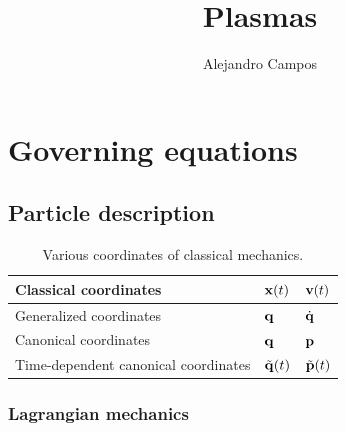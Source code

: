 \documentclass[a4paper,11pt]{report}
\title{Plasmas}
\author{Alejandro Campos}
\newcommand{\qvecdot}{\dot{\qvec}}
\begin{document}
\maketitle
\tableofcontents

\chapter{Governing equations}

\section{Particle description}
\begin{table}[H]
    \renewcommand{\arraystretch}{1.5}
    \centering
    \caption{Various coordinates of classical mechanics. }
    \label{tb:classical_mechanics_coordinates}
     \begin{tabular}{|l|l|l|}
        \hline
        Classical coordinates & $\mathbf{x}(t)$ & $\mathbf{v}(t)$ \\
        \hline
        Generalized coordinates  & $\mathbf{q}$ & $\qvecdot$ \\
        \hline
        Canonical coordinates & $\mathbf{q}$ & $\mathbf{p}$ \\
        \hline
        Time-dependent canonical coordinates & $\tilde{\mathbf{q}}(t)$ & $ \tilde{\mathbf{p}}(t)$ \\
        \hline
     \end{tabular}
\end{table}
    
\subsection{Lagrangian mechanics}
    
\end{document}

